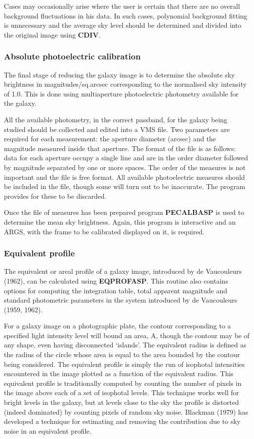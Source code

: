 Cases may occasionally arise where the user is certain that there are no overall
background fluctuations in his data.
In such cases, polynomial background fitting is unnecessary and the average sky
level should be determined and divided into the original image using {\bf CDIV}.
\subsubsection {Absolute photoelectric calibration}
The final stage of reducing the galaxy image is to determine the absolute sky
brightness in magnitudes/sq.arcsec corresponding to the normalised sky
intensity of 1.0.
This is done using multiaperture photoelectric photometry available for the
galaxy.

All the available photometry, in the correct passband, for the galaxy being
studied should be collected and edited into a VMS file.
Two parameters are required for each measurement: the aperture diameter
(arcsec) and the magnitude measured inside that aperture.
The format of the file is as follows: data for each aperture occupy a single
line and are in the order diameter followed by magnitude separated by one or
more spaces.
The order of the measures is not important and the file is free format.
All available photoelectric measures should be included in the file, though some
will turn out to be inaccurate.
The program provides for these to be discarded.

Once the file of measures has been prepared program {\bf PECALBASP} is used to
determine the mean sky brightness.
Again, this program is interactive and an ARGS, with the frame to be calibrated
displayed on it, is required.
\subsubsection {Equivalent profile}
The equivalent or areal profile of a galaxy image, introduced by de Vaucouleurs
(1962), can be calculated using {\bf EQPROFASP}.
This routine also contains options for computing the integration table, total
apparent magnitude and standard photometric parameters in the system introduced
by de Vaucouleurs (1959, 1962).

For a galaxy image on a photographic plate, the contour corresponding to a
specified light intensity level will bound an area, A, though the contour may be
of any shape, even having disconnected `islands'.
The equivalent radius is defined as the radius of the circle whose area is equal
to the area bounded by the contour being considered.
The equivalent profile is simply the run of isophotal intensities encountered in
the image plotted as a function of the equivalent radius.
This equivalent profile is traditionally computed by counting the number of
pixels in the image above each of a set of isophotal levels.
This technique works well for bright levels in the galaxy, but at levels close
to the sky the profile is distorted (indeed dominated) by counting pixels of
random sky noise.
Blackman (1979) has developed a technique for estimating and removing the
contribution due to sky noise in an equivalent profile.

